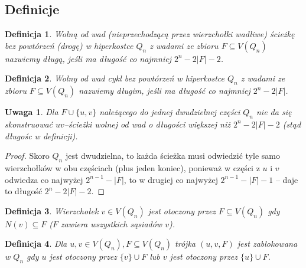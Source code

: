 \documentclass{pracamgr}
\newtheorem{defi}{Definicja}[section] %
\newtheorem{remark}[theorem]{Uwaga}
\begin{document}
   \subsection{Definicje}
    \begin{defi}\label{dluga sciezka}
     Wolną od wad (nieprzechodzącą przez wierzchołki wadliwe)
     ścieżkę bez powtórzeń (drogę) w hiperkostce $Q_n$ z wadami ze zbioru $F\subseteq V(Q_n)$ nazwiemy długą, jeśli ma długość co najmniej $2^n-2|F|-2$.
    \end{defi}
    \begin{defi}\label{dlugi cykl}
     Wolny od wad cykl bez powtórzeń w hiperkostce $Q_n$ z wadami ze zbioru $F\subseteq V(Q_n)$ nazwiemy długim, jeśli ma długość co najmniej $2^n-2|F|$.
    \end{defi}
    \begin{remark}\label{dluga sciezka- nie da sie dluzszej}
     Dla $F\cup\{u,v\}$ należącego do jednej dwudzielnej części $Q_n$ nie da się skonstruować $uv$--ścieżki wolnej od wad o długości większej niż $2^n-2|F|-2$
     (stąd długośc w definicji).
    \end{remark}
    \begin{proof}
     Skoro $Q_n$ jest dwudzielna, to każda ścieżka musi odwiedzić tyle samo wierzchołków w obu częściach (plus jeden koniec), ponieważ w części z $u$ i $v$
     odwiedza co najwyżej $2^{n-1}-|F|$, to w drugiej co najwyżej $2^{n-1}-|F|-1$ -- daje to długość $2^n-2|F|-2$.
    \end{proof}
    \begin{defi}\label{wierzcholek otoczony}
     Wierzchołek $v\in V(Q_n)$ jest \emph{otoczony} przez $F\subseteq V(Q_n)$ gdy $N(v)\subseteq F$ ($F$ zawiera wszystkich sąsiadów $v$).
    \end{defi}
    \begin{defi}\label{para zablokowana}
     Dla $u,v\in V(Q_n), F\subseteq V(Q_n)$
     trójka $(u,v,F)$ jest \emph{zablokowana w $Q_n$} gdy $u$ jest otoczony przez $\{v\}\cup F$ lub $v$ jest otoczony przez $\{u\}\cup F$.
    \end{defi}
\end{document}
